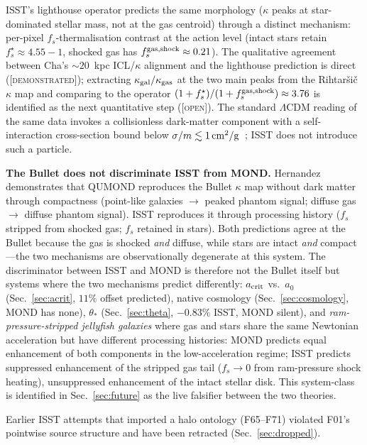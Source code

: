 \documentclass[aps,prd,twocolumn,nofootinbib,floatfix,superscriptaddress]{revtex4-2}
\newcommand{\DEMO}{{\color{black!70!blue}\textsc{[demonstrated]}}}
\newcommand{\OPEN}{{\color{black!60!red}\textsc{[open]}}}
\begin{document}
ISST's lighthouse operator predicts the same morphology
($\kappa$ peaks at star-dominated stellar mass, not at the gas
centroid) through a distinct mechanism: per-pixel $f_s$-thermalisation
contrast at the action level (intact stars retain
$f_s^\star\approx 4.55-1$, shocked gas has
$f_s^{\rm gas,shock}\approx 0.21$). The qualitative agreement
between Cha's $\sim 20$~kpc ICL/$\kappa$ alignment and the lighthouse
prediction is direct (\DEMO); extracting
$\kappa_{\rm gal}/\kappa_{\rm gas}$ at the two main peaks from the
Rihtar\v{s}i\v{c} $\kappa$ map and comparing to the operator
$(1+f_s^\star)/(1+f_s^{\rm gas,shock}) \approx 3.76$ is identified
as the next quantitative step (\OPEN). The standard $\Lambda$CDM
reading of the same data invokes a collisionless dark-matter
component with a self-interaction cross-section bound below
$\sigma/m\lesssim 1\,{\rm cm^2/g}$~\cite{Markevitch2004,Clowe2006};
ISST does not introduce such a particle.

\textbf{The Bullet does not discriminate ISST from MOND.}
Hernandez~\cite{Hernandez2026} demonstrates that QUMOND reproduces
the Bullet $\kappa$ map without dark matter through compactness
(point-like galaxies $\to$ peaked phantom signal; diffuse gas $\to$
diffuse phantom signal). ISST reproduces it through processing
history ($f_s$ stripped from shocked gas; $f_s$ retained in stars).
Both predictions agree at the Bullet because the gas is shocked
\emph{and} diffuse, while stars are intact \emph{and} compact---the
two mechanisms are observationally degenerate at this system.
The discriminator between ISST and MOND is therefore not the Bullet
itself but systems where the two mechanisms predict differently:
$a_{\rm crit}$ vs.\ $a_0$ (Sec.~\ref{sec:acrit}, $11\%$ offset
predicted), native cosmology (Sec.~\ref{sec:cosmology}, MOND has
none), $\theta_*$ (Sec.~\ref{sec:theta}, $-0.83\%$ ISST, MOND
silent), and \emph{ram-pressure-stripped jellyfish galaxies} where
gas and stars share the same Newtonian acceleration but have
different processing histories: MOND predicts equal enhancement of
both components in the low-acceleration regime; ISST predicts
suppressed enhancement of the stripped gas tail
($f_s\to 0$ from ram-pressure shock heating), unsuppressed
enhancement of the intact stellar disk. This system-class is
identified in Sec.~\ref{sec:future} as the live falsifier between
the two theories.

Earlier ISST attempts that imported a halo ontology (F65--F71)
violated F01's pointwise source structure and have been retracted
(Sec.~\ref{sec:dropped}).
\end{document}

